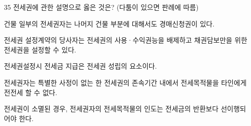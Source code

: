 \begin{question}{35}
전세권에 관한 설명으로 옳은 것은? (다툼이 있으면 판례에 따름)
\begin{choices}
  \item 건물 일부의 전세권자는 나머지 건물 부분에 대해서도 경매신청권이 있다.
  \item 전세권 설정계약의 당사자는 전세권의 사용·수익권능을 배제하고 채권담보만을 위한 전세권을 설정할 수 있다.
  \item 전세권설정시 전세금 지급은 전세권 성립의 요소이다.
  \item 전세권자는 특별한 사정이 없는 한 전세권의 존속기간 내에서 전세목적물을 타인에게 전전세 할 수 없다.
  \item 전세권이 소멸된 경우, 전세권자의 전세목적물의 인도는 전세금의 반환보다 선이행되어야 한다.
\end{choices}
\end{question}
